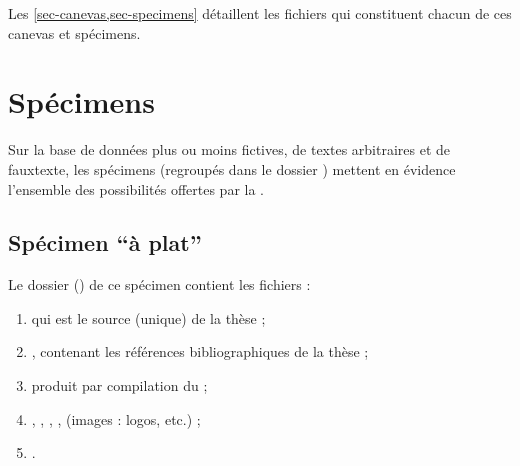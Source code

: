 Les \vref{sec-canevas,sec-specimens} détaillent les fichiers qui constituent
chacun de ces canevas et spécimens.




\section{Spécimens}
\label{sec-specimens}

Sur la base de données plus ou moins fictives, de textes arbitraires et de
\gls{fauxtexte}, les spécimens (regroupés dans le dossier )
mettent en évidence l'ensemble des possibilités offertes par la \yatCl{}.

\subsection{Spécimen \enquote{à plat}}
\label{sec-specimen-a-plat}
%

Le dossier () de ce spécimen contient les fichiers :
\begin{enumerate}
\item {} qui est le source  (unique) de la thèse ;
\item {}, contenant les références bibliographiques de
  la thèse ;
\item {} produit par compilation du  ;
\item {}, , , ,
   (images : logos, etc.) ;
\item {}.
\end{enumerate}

